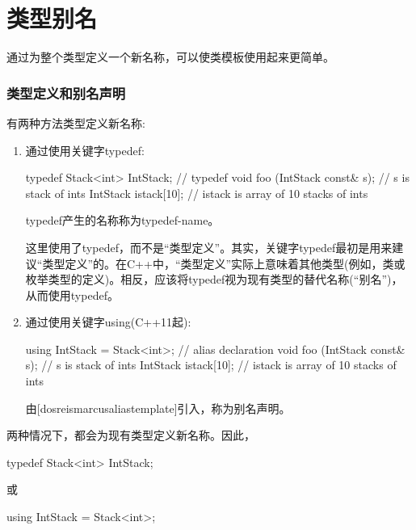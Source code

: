 \section{类型别名}

通过为整个类型定义一个新名称，可以使类模板使用起来更简单。

\subsubsection{类型定义和别名声明}

有两种方法类型定义新名称:

\begin{enumerate}
\item
通过使用关键字typedef:

\begin{cpp}
typedef Stack<int> IntStack; // typedef
void foo (IntStack const& s); // s is stack of ints
IntStack istack[10]; // istack is array of 10 stacks of ints
\end{cpp}

typedef产生的名称称为typedef-name。

\begin{notice}这里使用了typedef，而不是“类型定义”。其实，关键字typedef最初是用来建议“类型定义”的。在C++中，“类型定义”实际上意味着其他类型(例如，类或枚举类型的定义)。相反，应该将typedef视为现有类型的替代名称(“别名”)，从而使用typedef。
\end{notice}

\item
通过使用关键字using(C++11起):

\begin{cpp}
using IntStack = Stack<int>; // alias declaration
void foo (IntStack const& s); // s is stack of ints
IntStack istack[10]; // istack is array of 10 stacks of ints
\end{cpp}

由[dosreismarcusaliastemplate]引入，称为别名声明。

\end{enumerate}

两种情况下，都会为现有类型定义新名称。因此，

\begin{cpp}
typedef Stack<int> IntStack;
\end{cpp}

或

\begin{cpp}
using IntStack = Stack<int>;
\end{cpp}


